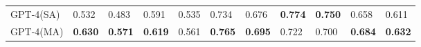 \begin{table}[t]
\begin{center}
\begin{tabularx}{\textwidth}{p{2cm} | X | X | X | X | X | X | X | X | X | X}
\hline
GPT-4(SA)                         & 0.532          & 0.483          & 0.591         & 0.535         & 0.734           & 0.676          & \textbf{0.774}           & \textbf{0.750}           & 0.658      & 0.611        \\
GPT-4(MA)                          & \textbf{0.630}           & \textbf{0.571}          & \textbf{0.619}         & 0.561         & \textbf{0.765}           & \textbf{0.695}          & 0.722           & 0.700            & \textbf{0.684}        & \textbf{0.632}    
\end{tabularx}
\end{center}
\end{table}